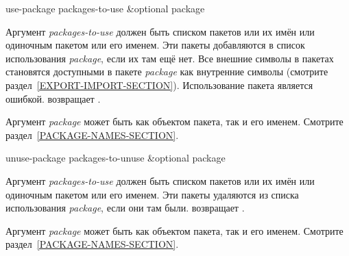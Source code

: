 \begin{defun}[Функция]
use-package packages-to-use &optional package

Аргумент \emph{packages-to-use} должен быть списком пакетов или их имён или
одиночным пакетом или его именем. Эти пакеты добавляются в список использования
\emph{package}, если их там ещё нет. Все внешние символы в пакетах становятся
доступными в пакете \emph{package} как внутренние символы (смотрите
раздел~\ref{EXPORT-IMPORT-SECTION}).
Использование пакета  является ошибкой.
 возвращает {\true}.

Аргумент \emph{package} может быть как объектом пакета, так и его
именем. Смотрите раздел~\ref{PACKAGE-NAMES-SECTION}.
\end{defun}

\begin{defun}[Функция]
unuse-package packages-to-unuse &optional package

Аргумент \emph{packages-to-use} должен быть списком пакетов или их имён или
одиночным пакетом или его именем. Эти пакеты удаляются из списка использования
\emph{package}, если они там были.
 возвращает {\true}.

Аргумент \emph{package} может быть как объектом пакета, так и его
именем. Смотрите раздел~\ref{PACKAGE-NAMES-SECTION}.
\end{defun}

